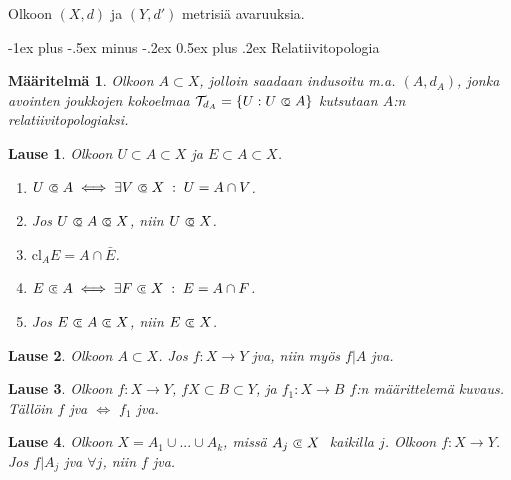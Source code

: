 \documentclass[landscape,a4paper,10pt]{article}
\makeatletter
\renewcommand{\section}{\@startsection{section}{1}{0mm}%
                                {-1ex plus -.5ex minus -.2ex}%
                                {0.5ex plus .2ex}%
                                {\color{blue}\normalfont\large\bfseries}}
\newcommand\opn{\mathrel{\ooalign{$\subset$\cr
  \hidewidth\hbox{$\circ\mkern.5mu$}\cr}}}
\newcommand\cls{\mathrel{\ooalign{$\subset$\cr
\hidewidth\raise.225ex\hbox{$\text{{\scriptsize c}}\mkern2mu$}\cr}}}
\theoremstyle{customtheoremstyle}
\newtheorem*{theorem}{Lause}
\newtheorem*{definition}{Määritelmä}
\makeatother
\begin{document}
\begin{multicols*}{3}

Olkoon $(X,d)$ ja $(Y,d')$ metrisiä avaruuksia.

\section{Relatiivitopologia}

\begin{definition}
  Olkoon $A \subset X$, jolloin saadaan indusoitu m.a. $(A,d_A)$, jonka
  avointen joukkojen kokoelmaa $\mathcal{T}_{d_A} = \{ U : U \opn A \}$
  kutsutaan $A$:n relatiivitopologiaksi.
\end{definition}


\begin{theorem}
  Olkoon $U \subset A \subset X$ ja $E \subset A \subset X$.
  \begin{enumerate}
    \item{$U \opn A \iff \exists V \opn X \;:\; U = A \cap V$.}
    \item{Jos $U \opn A \opn X$, niin $U \opn X$.}
    \item{$\text{cl}_A E = A \cap \bar{E}$.}
    \item{$E \cls A \iff \exists F \cls X \;:\; E = A \cap F$.}
    \item{Jos $E \cls A \cls X$, niin $E \cls X$.}
  \end{enumerate}
\end{theorem}

\begin{theorem}
  Olkoon $A \subset X$. Jos $f: X \rightarrow Y$ jva, niin myös $f|A$ jva.
\end{theorem}

\begin{theorem}
  Olkoon $f: X \rightarrow Y$, $f X \subset B \subset Y$, ja $f_1 : X
  \rightarrow B$ $f$:n määrittelemä kuvaus. Tällöin $f$ jva $\iff$ $f_1$ jva.
\end{theorem}

\begin{theorem}
  Olkoon $X = A_1 \cup ... \cup A_k$, missä $A_j \cls X \;$ kaikilla $j$.
  Olkoon $f: X \rightarrow Y$. Jos $f|A_j$ jva $\forall j$, niin
  $f$ jva.
\end{theorem}



\end{multicols*}
\end{document}
